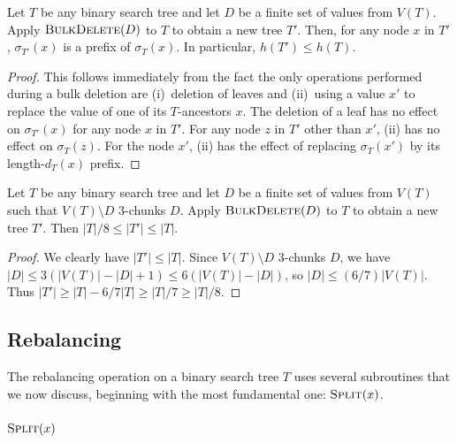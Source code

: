 \documentclass[kpfonts]{patmorin}
\let\le\leqslant
\let\ge\geqslant
\let\leq\leqslant
\let\geq\geqslant
\begin{document}
\begin{lem}
  Let $T$ be any binary search tree and let $D$ be a finite set of values from $V(T)$.
  Apply $\textsc{BulkDelete}(D)$ to $T$ to obtain a new tree $T'$.
  Then, for any node $x$ in $T'$, $\sigma_{T'}(x)$ is a prefix of $\sigma_T(x)$.
  In particular, $h(T')\leq h(T)$.
\end{lem}

\begin{proof}
  This follows immediately from the fact the only operations performed during a bulk deletion are (i)~deletion of leaves and (ii)~using a value $x'$ to replace the value of one of its $T$-ancestors $x$.  The deletion of a leaf has no effect on $\sigma_{T'}(x)$ for any node $x$ in $T'$.  For any node $z$ in $T'$ other than $x'$, (ii) has no effect on $\sigma_T(z)$.  For the node $x'$, (ii) has the effect of replacing $\sigma_T(x')$ by its length-$d_T(x)$ prefix.
\end{proof}

\begin{lem}
  Let $T$ be any binary search tree and let $D$ be a finite set of values from $V(T)$ such that $V(T)\setminus D$ $3$-chunks $D$.
  Apply $\textsc{BulkDelete}(D)$ to $T$ to obtain a new tree $T'$.
  Then $|T|/8 \le |T'|\le |T|$.
\end{lem}

\begin{proof}
 We clearly have $|T'|\le |T|$.  Since $V(T)\setminus D$ $3$-chunks $D$, we have $|D|\le 3(|V(T)|-|D| + 1) \le 6(|V(T)|-|D|)$, so $|D|\le (6/7)|V(T)|$. Thus $|T'| \ge |T| - 6/7|T| \geq |T|/7 \geq |T|/8$.
\end{proof}

\subsection{Rebalancing}

The rebalancing operation on a binary search tree $T$ uses several subroutines that we now discuss, beginning with the most fundamental one:  $\textsc{Split}(x)$.

\subsubsection{$\textsc{Split}(x)$}
\end{document}
